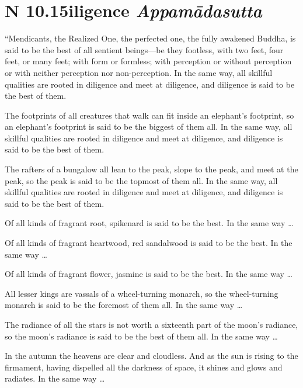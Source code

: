 \documentclass[12pt,openany]{book}%
\newcommand*{\suttatitleacronym}[1]{\smaller[2]{#1}\vspace*{.3em}}
\newcommand*{\suttatitletranslation}[1]{\linebreak{#1}}
\newcommand*{\suttatitleroot}[1]{\linebreak\smaller[2]\itshape{#1}}
\newcommand*{\tocacronym}[1]{\hspace*{-3.3em}{#1}\quad}
\newcommand*{\toctranslation}[1]{#1}
\newcommand*{\tocroot}[1]{(\textit{#1})}
\begin{document}
%
\section*{{\suttatitleacronym AN 10.15}{\suttatitletranslation Diligence }{\suttatitleroot Appamādasutta}}
\addcontentsline{toc}{section}{\tocacronym{AN 10.15} \toctranslation{Diligence } \tocroot{Appamādasutta}}

“Mendicants, the Realized One, the perfected one, the fully awakened Buddha, is said to be the best of all sentient beings—be they footless, with two feet, four feet, or many feet; with form or formless; with perception or without perception or with neither perception nor non-perception. In the same way, all skillful qualities are rooted in diligence and meet at diligence, and diligence is said to be the best of them. 

The footprints of all creatures that walk can fit inside an elephant’s footprint, so an elephant’s footprint is said to be the biggest of them all. In the same way, all skillful qualities are rooted in diligence and meet at diligence, and diligence is said to be the best of them. 

The rafters of a bungalow all lean to the peak, slope to the peak, and meet at the peak, so the peak is said to be the topmost of them all. In the same way, all skillful qualities are rooted in diligence and meet at diligence, and diligence is said to be the best of them. 

Of all kinds of fragrant root, spikenard is said to be the best. In the same way … 

Of all kinds of fragrant heartwood, red sandalwood is said to be the best. In the same way … 

Of all kinds of fragrant flower, jasmine is said to be the best. In the same way … 

All lesser kings are vassals of a wheel-turning monarch, so the wheel-turning monarch is said to be the foremost of them all. In the same way … 

The radiance of all the stars is not worth a sixteenth part of the moon’s radiance, so the moon’s radiance is said to be the best of them all. In the same way … 

In the autumn the heavens are clear and cloudless. And as the sun is rising to the firmament, having dispelled all the darkness of space, it shines and glows and radiates. In the same way … 
\end{document}

